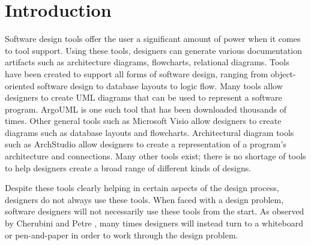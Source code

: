 \chapter{Introduction}

Software design tools offer the user a significant amount of power when it comes to tool support. 
Using these tools, designers can generate various documentation artifacts such as architecture diagrams, flowcharts, relational diagrams.
Tools have been created to support all forms of software design, ranging from object-oriented software design to database layouts to logic flow.
Many tools allow designers to create UML diagrams that can be used to represent a software program. ArgoUML \cite{argouml} is one such tool that has been downloaded thousands of times.
Other general tools such as Microsoft Visio \cite{visio} allow designers to create diagrams such as database layouts and flowcharts. 
Architectural diagram tools such as ArchStudio \cite{archstudio} allow designers to create a representation of a program's architecture and connections.
Many other tools exist; there is no shortage of tools to help designers create a broad range of different kinds of designs.


Despite these tools clearly helping in certain aspects of the design process, designers do not always use these tools.
When faced with a design problem, software designers will not necessarily use these tools from the start. 
As observed by Cherubini \cite{cherubini} and Petre \cite{petre}, many times designers will instead turn to a whiteboard or pen-and-paper in order to work through the design problem.


